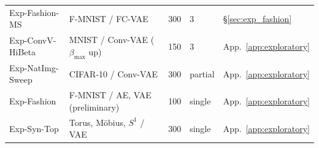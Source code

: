 \documentclass[11pt,a4paper]{jsarticle}
\begin{document}
\begin{table}[H]
\begin{tabular}{p{3.4cm}p{3.4cm}p{2.2cm}p{1.6cm}p{2.2cm}}
Exp-Fashion-MS & F-MNIST / FC-VAE & 300 & 3 & §\ref{sec:exp_fashion} \\
Exp-ConvV-HiBeta & MNIST / Conv-VAE ($\beta_{\max}$ up) & 150 & 3 & App.~\ref{app:exploratory} \\
Exp-NatImg-Sweep & CIFAR-10 / Conv-VAE & 300 & partial & App.~\ref{app:exploratory} \\
Exp-Fashion & F-MNIST / AE, VAE (preliminary) & 100 & single & App.~\ref{app:exploratory} \\
Exp-Syn-Top & Torus, M\"obius, $S^1$ / VAE & 300 & single & App.~\ref{app:exploratory} \\
\bottomrule
\end{tabular}
\end{table}
\end{document}
